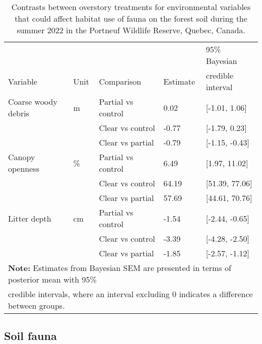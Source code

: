 \begin{table}[ht]
  \centering
  \caption[Contrasts between overstory treatments for environmental variables that could affect habitat selection of fauna on the forest soil.]
  {Contrasts between overstory treatments for environmental variables that could affect habitat use of fauna on the forest soil during the summer 2022 in the Portneuf Wildlife Reserve,
  Quebec, Canada.}
  \label{tab:overstoryenvar}
  \begin{tabular}{lllll} 
      \hline
      &&&&95\% Bayesian \\
      Variable&Unit& Comparison & Estimate &  credible interval \\ [0.5ex] 
      \hline
      Coarse woody debris &m\up{3}& Partial vs control & \hspace{1mm}0.02 & [-1.01, 1.06] \\ 
                 && Clear vs control  & -0.77 & [-1.79, 0.23] \\ 
                          && Clear vs partial  & -0.79 & [-1.15, -0.43] \\
      Canopy openness     &\%& Partial vs control & \hspace{1mm}6.49 & [1.97, 11.02] \\ 
                      && Clear vs control  & \hspace{1mm}64.19 & [51.39, 77.06] \\ 
                          && Clear vs partial  & \hspace{1mm}57.69 & [44.61, 70.76] \\ 
      Litter depth        &cm& Partial vs control & -1.54 & [-2.44, -0.65] \\ 
                      && Clear vs control  & -3.39 & [-4.28, -2.50] \\ 
                          && Clear vs partial  & -1.85 & [-2.57, -1.12] \\       
      \hline
      \multicolumn{5}{l}{\textbf{Note:} Estimates from Bayesian SEM are presented in terms of posterior mean with 95\%} \\
      \multicolumn{5}{l}{credible intervals, where an interval excluding 0 indicates a difference between groups.} \\
  \end{tabular}
\end{table}

\clearpage


\subsection*{Soil fauna}
\label{subsec:taxa}

